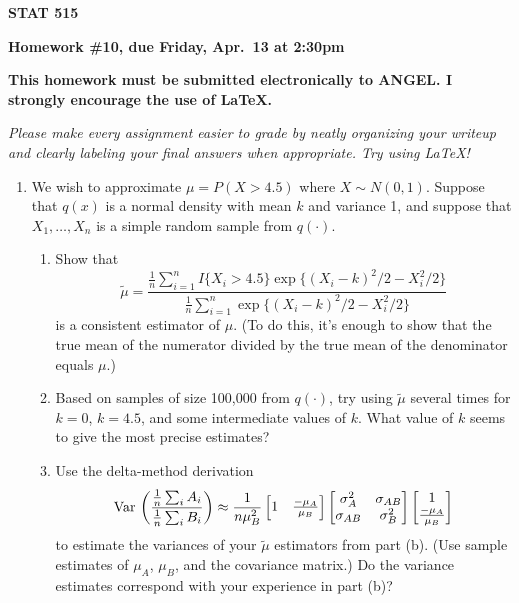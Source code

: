 \documentclass{article}
\def\Var{\mathop{\rm Var\,}\nolimits}
\begin{document}
\begin{center}
{\bf STAT 515}

{\bf Homework \#10, due Friday, Apr.~13 at 2:30pm}

{\bf This homework must be submitted electronically to ANGEL. I strongly
encourage the use of \LaTeX.}

\end{center}

{\it Please make every assignment easier to grade by neatly organizing your
writeup and clearly labeling your final answers when appropriate. Try using
\LaTeX!}


\begin{enumerate}

  \item We wish to approximate $\mu=P(X>4.5)$ where $X\sim N(0,1)$. Suppose that
  $q(x)$ is a normal density with mean $k$ and variance 1, and suppose that $X_1, \ldots, X_n$
  is a simple random sample from $q(\cdot)$.
  
    \begin{enumerate}
    
      \item Show that 
      \[
      \tilde\mu = \frac{ \frac1n \sum_{i=1}^n I\{X_i>4.5\} \exp\{
      (X_i-k)^2/2-X_i^2/2 \} }
      { \frac1n \sum_{i=1}^n \exp\{ (X_i-k)^2/2-X_i^2/2 \} }
      \]
      is a consistent estimator of $\mu$. (To do this, it's enough to show that
      the true mean of the numerator divided by the true mean of the denominator
      equals $\mu$.)
      
      \item Based on samples of size 100,000 from $q(\cdot)$, try using
      $\tilde\mu$ several times for $k=0$, $k=4.5$, and some intermediate values
      of $k$. What value of $k$ seems to give the most precise estimates?
      
      \item Use the delta-method derivation
      \[
      {\Var} \left( \frac{ \frac1n\sum_i A_i}{\frac1n\sum_i B_i} \right) \approx
      \frac{1}{n\mu_B^2}
      \begin{bmatrix}
      1 & \frac{-\mu_A}{\mu_B}
      \end{bmatrix}
      \begin{bmatrix}
      \sigma^2_A & \sigma_{AB} \\ \sigma_{AB} & \sigma^2_B
      \end{bmatrix}
      \begin{bmatrix}
      1 \\ \frac{-\mu_A}{\mu_B}
      \end{bmatrix}
      \]
      to estimate the variances of your $\tilde\mu$ estimators from part (b).
      (Use sample estimates of $\mu_A$, $\mu_B$, and the covariance matrix.) Do
      the variance estimates correspond with your experience in part (b)?


\end{enumerate}
\end{enumerate}
\end{document}
